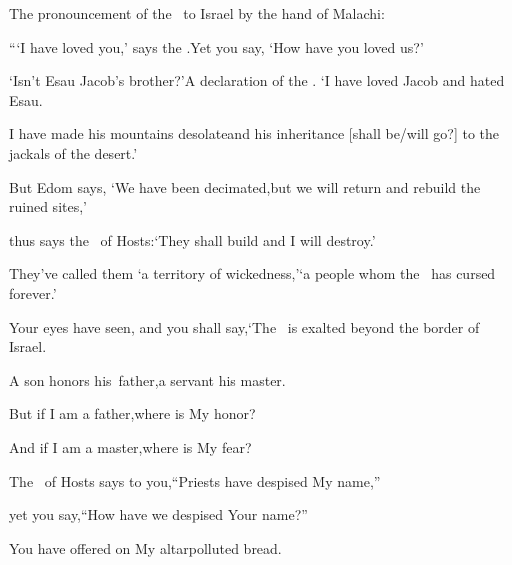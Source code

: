 
\begin{inparaenum}
   The pronouncement of the \lord\ to Israel by the hand of Malachi:\smallskip%

  \pa{} ``\thinspace`I have loved you,' says the \lord.\pa{}Yet you say, `How have you loved us?'%

  \pb{}`Isn't Esau Jacob's brother?'\pa{}A declaration of the \lord.%
  \pa{}`I have loved Jacob\pa{} and hated Esau.%

  \pb{}I have made his mountains desolate\pa{}and his inheritance [shall be/will go?] to the jackals%
  of the desert.'%

  \pa{} But Edom says, `We have been decimated,\pa{}but we will return and rebuild the ruined sites,'%

  \pb{}thus says the \lord\ of Hosts:\pa{}`They shall build and I will destroy.'%

  \pb{}They've called%
  them `a territory of wickedness,'\pa{}`a people whom the \lord\ has cursed forever.'%

  \pa{} Your eyes have seen, and you shall say,\pa{}`The \lord\ is exalted beyond the border of Israel.%

  \pb{} A son honors his\understood{}\ father,\pa{}a servant his master.%

  \pc{}But if I am a father,\pa{}where is My honor?%

  \pc{}And if I am a master,\pa{}where is My fear?%

  \pc{}The \lord\ of Hosts says to you,\pa{}``Priests have despised My name,''%

  \pc{}yet you say,\pa{}``How have we despised Your name?''%

  \pb{} You have offered on My altar\pa{}polluted%
  bread.%


\end{inparaenum}
